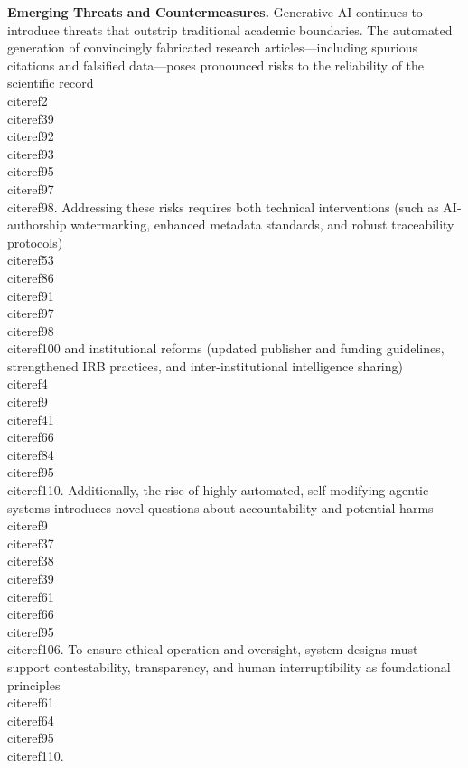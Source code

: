 \documentclass[11pt]{article}
\begin{document}
\textbf{Emerging Threats and Countermeasures.}  
Generative AI continues to introduce threats that outstrip traditional academic boundaries. The automated generation of convincingly fabricated research articles—including spurious citations and falsified data—poses pronounced risks to the reliability of the scientific record \\cite{ref2}\\cite{ref39}\\cite{ref92}\\cite{ref93}\\cite{ref95}\\cite{ref97}\\cite{ref98}. Addressing these risks requires both technical interventions (such as AI-authorship watermarking, enhanced metadata standards, and robust traceability protocols) \\cite{ref53}\\cite{ref86}\\cite{ref91}\\cite{ref97}\\cite{ref98}\\cite{ref100} and institutional reforms (updated publisher and funding guidelines, strengthened IRB practices, and inter-institutional intelligence sharing) \\cite{ref4}\\cite{ref9}\\cite{ref41}\\cite{ref66}\\cite{ref84}\\cite{ref95}\\cite{ref110}. Additionally, the rise of highly automated, self-modifying agentic systems introduces novel questions about accountability and potential harms \\cite{ref9}\\cite{ref37}\\cite{ref38}\\cite{ref39}\\cite{ref61}\\cite{ref66}\\cite{ref95}\\cite{ref106}. To ensure ethical operation and oversight, system designs must support contestability, transparency, and human interruptibility as foundational principles \\cite{ref61}\\cite{ref64}\\cite{ref95}\\cite{ref110}.
\end{document}
